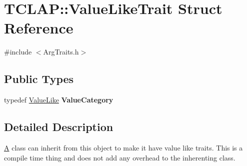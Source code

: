 \hypertarget{struct_t_c_l_a_p_1_1_value_like_trait}{\section{T\+C\+L\+A\+P\+:\+:Value\+Like\+Trait Struct Reference}
\label{struct_t_c_l_a_p_1_1_value_like_trait}
}


{\ttfamily \#include $<$Arg\+Traits.\+h$>$}

\subsection*{Public Types}
\begin{DoxyCompactItemize}
\item 
\hypertarget{struct_t_c_l_a_p_1_1_value_like_trait_aac4ee14f65926b8e741d797a8900a79a}{typedef \hyperlink{struct_t_c_l_a_p_1_1_value_like}{Value\+Like} {\bfseries Value\+Category}}\label{struct_t_c_l_a_p_1_1_value_like_trait_aac4ee14f65926b8e741d797a8900a79a}

\end{DoxyCompactItemize}


\subsection{Detailed Description}
\hyperlink{class_a}{A} class can inherit from this object to make it have value like traits. This is a compile time thing and does not add any overhead to the inherenting class. 